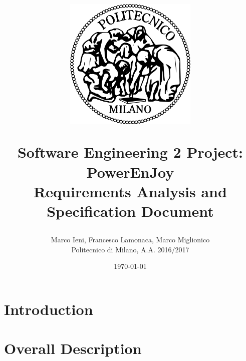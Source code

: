\documentclass[a4paper, 12pt]{report}
\title{
	\begin{figure}[h]
		\centering
		\includegraphics{../common_resources/logo_polimi.png}
	\end{figure}
	\vspace{30px}
	Software Engineering 2 Project: PowerEnJoy \\ \vspace{1em}
	\textbf{R}equirements \textbf{A}nalysis and \textbf{S}pecification \textbf{D}ocument
}
\author{Marco Ieni, Francesco Lamonaca, Marco Miglionico\\Politecnico di Milano, A.A. 2016/2017}
\date{\today}
\begin{document}
\maketitle
\tableofcontents

\chapter{Introduction}
\label{ch:introduction}





\chapter{Overall Description}
\label{ch:overall_description}

\end{document}
